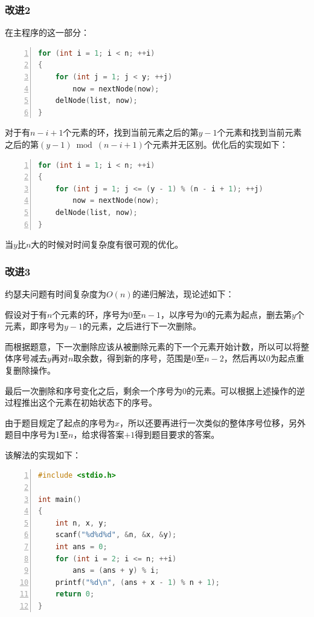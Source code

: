 \documentclass{article}
\begin{document}
\subsubsection{改进2}

在主程序的这一部分：

\begin{lstlisting}[language={C},
    numbers=left,
    numberstyle=\tiny\menlo,
    basicstyle=\small\menlo]
for (int i = 1; i < n; ++i)
{
    for (int j = 1; j < y; ++j)
        now = nextNode(now);
    delNode(list, now);
}
\end{lstlisting}

对于有$n-i+1$个元素的环，找到当前元素之后的第$y-1$个元素和找到当前元素之后的第$(y-1)\bmod (n-i+1)$个元素并无区别。优化后的实现如下：

\begin{lstlisting}[language={C},
    numbers=left,
    numberstyle=\tiny\menlo,
    basicstyle=\small\menlo]
for (int i = 1; i < n; ++i)
{
    for (int j = 1; j <= (y - 1) % (n - i + 1); ++j)
        now = nextNode(now);
    delNode(list, now);
}
\end{lstlisting}

当$y$比$n$大的时候对时间复杂度有很可观的优化。

\subsubsection{改进3}

约瑟夫问题有时间复杂度为$O(n)$的递归解法，现论述如下：

假设对于有$n$个元素的环，序号为0至$n-1$，以序号为0的元素为起点，删去第$y$个元素，即序号为$y-1$的元素，之后进行下一次删除。

而根据题意，下一次删除应该从被删除元素的下一个元素开始计数，所以可以将整体序号减去$y$再对$n$取余数，得到新的序号，范围是0至$n-2$，然后再以0为起点重复删除操作。

最后一次删除和序号变化之后，剩余一个序号为0的元素。可以根据上述操作的逆过程推出这个元素在初始状态下的序号。

由于题目规定了起点的序号为$x$，所以还要再进行一次类似的整体序号位移，另外题目中序号为1至$n$，给求得答案$+1$得到题目要求的答案。

该解法的实现如下：

\begin{lstlisting}[language={C},
    numbers=left,
    numberstyle=\tiny\menlo,
    basicstyle=\small\menlo]
#include <stdio.h>

int main()
{
    int n, x, y;
    scanf("%d%d%d", &n, &x, &y);
    int ans = 0;
    for (int i = 2; i <= n; ++i)
        ans = (ans + y) % i;
    printf("%d\n", (ans + x - 1) % n + 1);
    return 0;
}
\end{lstlisting}
\end{document}
